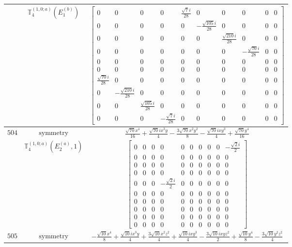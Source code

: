 \documentclass[fleqn,8pt,landscape]{jsarticle}
\begin{document}
\begin{longtable}{ccc}
$  $ & $ \mathbb{T}_{4}^{(1,0;a)}(E_{1}^{(b)}) $ & $ \begin{bmatrix} 0 & 0 & 0 & 0 & \frac{\sqrt{7} i}{28} & 0 & 0 & 0 & 0 & 0 \\ 0 & 0 & 0 & 0 & 0 & - \frac{\sqrt{105} i}{28} & 0 & 0 & 0 & 0 \\ 0 & 0 & 0 & 0 & 0 & 0 & \frac{\sqrt{210} i}{28} & 0 & 0 & 0 \\ 0 & 0 & 0 & 0 & 0 & 0 & 0 & - \frac{\sqrt{70} i}{28} & 0 & 0 \\ 0 & 0 & 0 & 0 & 0 & 0 & 0 & 0 & 0 & 0 \\ 0 & 0 & 0 & 0 & 0 & 0 & 0 & 0 & 0 & 0 \\ \frac{\sqrt{70} i}{28} & 0 & 0 & 0 & 0 & 0 & 0 & 0 & 0 & 0 \\ 0 & - \frac{\sqrt{210} i}{28} & 0 & 0 & 0 & 0 & 0 & 0 & 0 & 0 \\ 0 & 0 & \frac{\sqrt{105} i}{28} & 0 & 0 & 0 & 0 & 0 & 0 & 0 \\ 0 & 0 & 0 & - \frac{\sqrt{7} i}{28} & 0 & 0 & 0 & 0 & 0 & 0 \end{bmatrix} $ \\ \hline
$ 504 $ & $ \text{symmetry} $ & $ \frac{\sqrt{70} x^{4}}{16} + \frac{\sqrt{70} i x^{3} y}{4} - \frac{3 \sqrt{70} x^{2} y^{2}}{8} - \frac{\sqrt{70} i x y^{3}}{4} + \frac{\sqrt{70} y^{4}}{16} $ \\
$  $ & $ \mathbb{T}_{4}^{(1,0;a)}(E_{2}^{(a)},1) $ & $ \begin{bmatrix} 0 & 0 & 0 & 0 & 0 & 0 & 0 & 0 & 0 & - \frac{\sqrt{2} i}{2} \\ 0 & 0 & 0 & 0 & 0 & 0 & 0 & 0 & 0 & 0 \\ 0 & 0 & 0 & 0 & 0 & 0 & 0 & 0 & 0 & 0 \\ 0 & 0 & 0 & 0 & 0 & 0 & 0 & 0 & 0 & 0 \\ 0 & 0 & 0 & - \frac{\sqrt{2} i}{2} & 0 & 0 & 0 & 0 & 0 & 0 \\ 0 & 0 & 0 & 0 & 0 & 0 & 0 & 0 & 0 & 0 \\ 0 & 0 & 0 & 0 & 0 & 0 & 0 & 0 & 0 & 0 \\ 0 & 0 & 0 & 0 & 0 & 0 & 0 & 0 & 0 & 0 \\ 0 & 0 & 0 & 0 & 0 & 0 & 0 & 0 & 0 & 0 \\ 0 & 0 & 0 & 0 & 0 & 0 & 0 & 0 & 0 & 0 \end{bmatrix} $ \\ \hline
$ 505 $ & $ \text{symmetry} $ & $ - \frac{\sqrt{10} x^{4}}{8} + \frac{\sqrt{10} i x^{3} y}{4} + \frac{3 \sqrt{10} x^{2} z^{2}}{4} + \frac{\sqrt{10} i x y^{3}}{4} - \frac{3 \sqrt{10} i x y z^{2}}{2} + \frac{\sqrt{10} y^{4}}{8} - \frac{3 \sqrt{10} y^{2} z^{2}}{4} $ \\

\end{longtable}
\end{document}
